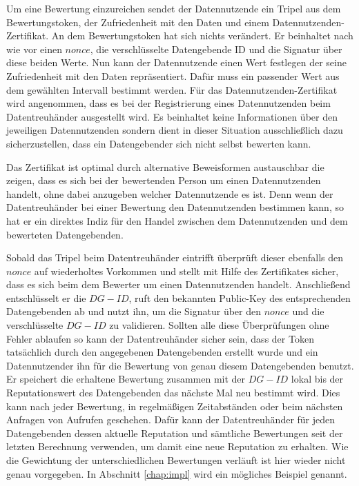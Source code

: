 \documentclass{scrreprt}
\begin{document}
Um eine Bewertung einzureichen sendet der Datennutzende ein Tripel aus dem Bewertungstoken, der Zufriedenheit mit den Daten und einem Datennutzenden-Zertifikat. An dem Bewertungstoken hat sich nichts verändert. Er beinhaltet nach wie vor einen $nonce$, die verschlüsselte Datengebende ID und die Signatur über diese beiden Werte. Nun kann der Datennutzende einen Wert festlegen der seine Zufriedenheit mit den Daten repräsentiert. Dafür muss ein passender Wert aus dem gewählten Intervall bestimmt werden. Für das Datennutzenden-Zertifikat wird angenommen, dass es bei der Registrierung eines Datennutzenden beim Datentreuhänder ausgestellt wird. Es beinhaltet keine Informationen über den jeweiligen Datennutzenden sondern dient in dieser Situation ausschließlich dazu sicherzustellen, dass ein Datengebender sich nicht selbst bewerten kann. 

Das Zertifikat ist optimal durch alternative Beweisformen austauschbar die zeigen, dass es sich bei der bewertenden Person um einen Datennutzenden handelt, ohne dabei anzugeben welcher Datennutzende es ist. Denn wenn der Datentreuhänder bei einer Bewertung den Datennutzenden bestimmen kann, so hat er ein direktes Indiz für den Handel zwischen dem Datennutzenden und dem bewerteten Datengebenden.

Sobald das Tripel beim Datentreuhänder eintrifft überprüft dieser ebenfalls den $nonce$ auf wiederholtes Vorkommen und stellt mit Hilfe des Zertifikates sicher, dass es sich beim dem Bewerter um einen Datennutzenden handelt. Anschließend entschlüsselt er die $DG-ID$, ruft den bekannten Public-Key des entsprechenden Datengebenden ab und nutzt ihn, um die Signatur über den $nonce$ und die verschlüsselte $DG-ID$ zu validieren. Sollten alle diese Überprüfungen ohne Fehler ablaufen so kann der Datentreuhänder sicher sein, dass der Token tatsächlich durch den angegebenen Datengebenden erstellt wurde und ein Datennutzender ihn für die Bewertung von genau diesem Datengebenden benutzt. Er speichert die erhaltene Bewertung zusammen mit der $DG-ID$ lokal bis der Reputationswert des Datengebenden das nächste Mal neu bestimmt wird. Dies kann nach jeder Bewertung, in regelmäßigen Zeitabständen oder beim nächsten Anfragen von Aufrufen geschehen. Dafür kann der Datentreuhänder für jeden Datengebenden dessen aktuelle Reputation und sämtliche Bewertungen seit der letzten Berechnung verwenden, um damit eine neue Reputation zu erhalten. Wie die Gewichtung der unterschiedlichen Bewertungen verläuft ist hier wieder nicht genau vorgegeben. In Abschnitt \ref{chap:impl} wird ein mögliches Beispiel genannt.
\end{document}
